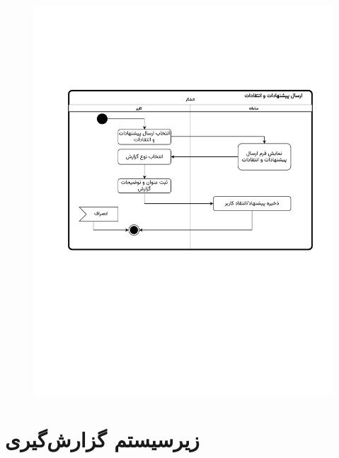 \begin{figure}[ht!]
	\centering
	\includegraphics[scale=0.8, page=1]{figs/OOD-activity-contactus.pdf}
\end{figure}
\FloatBarrier
\newpage


\section{زیرسیستم گزارش‌گیری}


